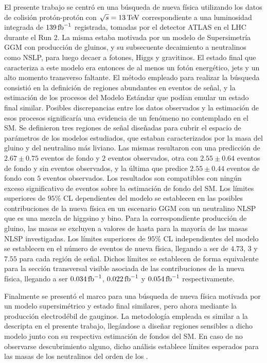 El presente trabajo se centró en una búsqueda de nueva física utilizando los datos de colisión protón-protón con $\sqrt{s}=13\,\text{TeV}$ correspondiente a una luminosidad integrada de $139\,\text{fb}^{-1}$ registrada, tomadas por el detector ATLAS en el LHC durante el Run 2. La misma estaba motivada por un modelo de Supersimetría GGM con producción de gluinos, y su subsecuente decaimiento a neutralinos como NSLP, para luego decaer a fotones, Higgs y gravitinos. El estado final que caracteriza a este modelo era entonces de al menos un fotón energético, jets y un alto momento transverso faltante. El método empleado para realizar la búsqueda consistió en la definición de regiones abundantes en eventos de señal, y la estimación de los procesos del Modelo Estándar que podían emular un estado final similar. Posibles discrepancias entre los datos observados y la estimación de esos procesos significaría una evidencia de un fenómeno no contemplado en el SM. 
Se definieron tres regiones de señal diseñadas para cubrir el espacio de parámetros de los modelos estudiados, que estaban caracterizados por la masa del gluino y del neutralino más liviano. Las mismas resultaron con una predicción de $2.67 \pm 0.75$ eventos de fondo y $2$ eventos observados, otra con $2.55 \pm 0.64$ eventos de fondo y sin eventos observados, y la última que predice $2.55 \pm 0.44$ eventos de fondo con $5$ eventos observados.
Los resultados son compatibles con ningún exceso significativo de eventos sobre la estimación de fondo del SM. Los límites superiores de $95\%$ CL dependientes del modelo se establecen en las posibles contribuciones de la nueva física en un escenario GGM con un neutralino NLSP que es una mezcla de higgsino y bino. Para la correspondiente producción de gluino, las masas se excluyen a valores de hasta  para la mayoría de las masas NLSP investigadas. Los límites superiores de $95\%$ CL independientes del modelo se establecen en el número de eventos de nueva física, llegando a ser de $4.73$, $3$ y $7.55$ para cada región de señal. Dichos límites se establecen de forma equivalente para la sección transversal visible asociada de las contribuciones de la nueva física, llegando a ser $0.034\,\text{fb}^{-1}$, $0.022\,\text{fb}^{-1}$ y $0.054\,\text{fb}^{-1}$ respectivamente. 

Finalmente se presentó el marco para una búsqueda de nueva física motivada por un modelo supersimétrico y estado final similares, pero ahora mediante la producción electrodébil de gauginos. La metodología empleada es similar a la descripta en el presente trabajo, llegándose a diseñar regiones sensibles a dicho modelo junto con su respectiva estimación de fondos del SM. En caso de no observarse descubrimiento alguno, dicho análisis establece límites esperados para las masas de los neutralinos del orden de los .